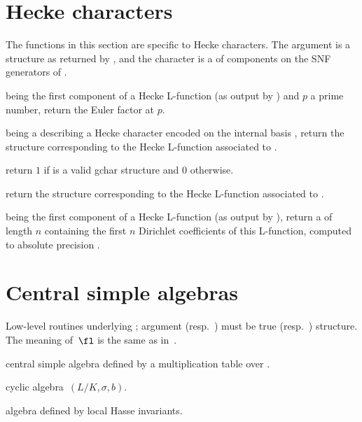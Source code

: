 \section{Hecke characters}

The functions in this section are specific to Hecke characters. The
argument  is a  structure as returned by
, and the character  is a 
of components on the SNF generators of .

  being the
first component of a Hecke L-function  (as output by
) and $p$ a prime number, return the Euler factor
at $p$.

  being a
 describing a Hecke character encoded on the internal
basis , return the 
structure corresponding to the Hecke L-function associated to .

 return $1$ if  is a valid
gchar structure and $0$ otherwise.

 return the  structure
corresponding to the Hecke L-function associated to .

  being the
first component of a Hecke L-function  (as output by
), return a  of length $n$ containing the
first $n$ Dirichlet coefficients of this L-function, computed to
absolute precision .

\section{Central simple algebras}


Low-level routines underlying ; argument  (resp.~)
must be true  (resp.~) structure. The meaning of~$\fl$ is the
same as in~.

central simple algebra defined by a multiplication table over .

cyclic algebra~$(L/K,\sigma,b)$.

algebra defined by local Hasse invariants.

